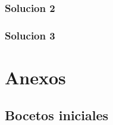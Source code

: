 \documentclass[a4paper,11pt]{article}
\begin{document}
\subsubsection{Solucion 2}
\subsubsection{Solucion 3}



\section{Anexos}
\subsection{Bocetos iniciales}\label{bocetos}
\end{document}
